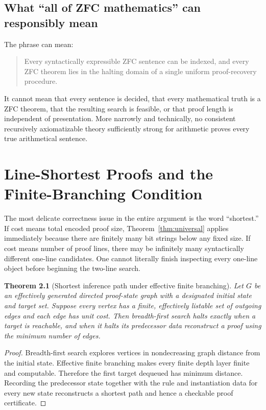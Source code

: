 \documentclass[11pt,oneside]{book}
\newtheorem{theorem}{Theorem}[chapter]
\theoremstyle{definition}
\theoremstyle{remark}
\begin{document}
\section{What ``all of ZFC mathematics'' can responsibly mean}
The phrase can mean:
\begin{quote}
Every syntactically expressible ZFC sentence can be indexed, and every ZFC theorem lies in the halting domain of a single uniform proof-recovery procedure.
\end{quote}
It cannot mean that every sentence is decided, that every mathematical truth is a ZFC theorem, that the resulting search is feasible, or that proof length is independent of presentation. More narrowly and technically, no consistent recursively axiomatizable theory sufficiently strong for arithmetic proves every true arithmetical sentence.

\chapter{Line-Shortest Proofs and the Finite-Branching Condition}\label{ch:lines}
The most delicate correctness issue in the entire argument is the word ``shortest.'' If cost means total encoded proof size, Theorem~\ref{thm:universal} applies immediately because there are finitely many bit strings below any fixed size. If cost means number of proof lines, there may be infinitely many syntactically different one-line candidates. One cannot literally finish inspecting every one-line object before beginning the two-line search.

\begin{theorem}[Shortest inference path under effective finite branching]\label{thm:bfs}
Let $G$ be an effectively generated directed proof-state graph with a designated initial state and target set. Suppose every vertex has a finite, effectively listable set of outgoing edges and each edge has unit cost. Then breadth-first search halts exactly when a target is reachable, and when it halts its predecessor data reconstruct a proof using the minimum number of edges.
\end{theorem}
\begin{proof}
Breadth-first search explores vertices in nondecreasing graph distance from the initial state. Effective finite branching makes every finite depth layer finite and computable. Therefore the first target dequeued has minimum distance. Recording the predecessor state together with the rule and instantiation data for every new state reconstructs a shortest path and hence a checkable proof certificate.
\end{proof}
\end{document}
